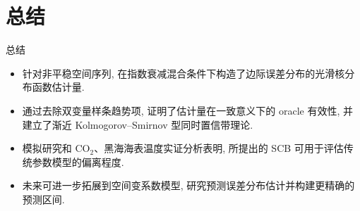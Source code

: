 \documentclass{beamer}
\begin{document}
\section{总结}
\begin{frame}{总结}
\begin{itemize}
    \item 针对非平稳空间序列, 在指数衰减混合条件下构造了边际误差分布的光滑核分布函数估计量.
    \item 通过去除双变量样条趋势项, 证明了估计量在一致意义下的 oracle 有效性, 并建立了渐近 Kolmogorov--Smirnov 型同时置信带理论.
    \item 模拟研究和 CO$_2$、黑海海表温度实证分析表明, 所提出的 SCB 可用于评估传统参数模型的偏离程度.
    \item 未来可进一步拓展到空间变系数模型, 研究预测误差分布估计并构建更精确的预测区间.
\end{itemize}
\end{frame}
\end{document}
